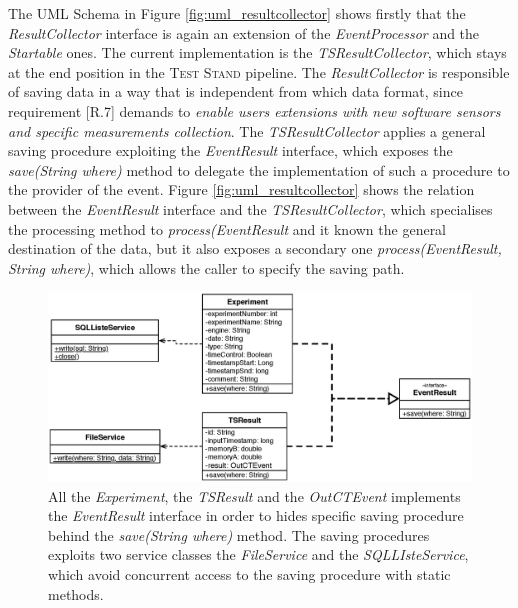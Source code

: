 The UML Schema in Figure \ref{fig:uml_resultcollector} shows firstly that the \textit{ResultCollector} interface is again an extension of the \textit{EventProcessor} and the \textit{Startable} ones. The current implementation is the \textit{TSResultCollector}, which stays at the end position in the \textsc{Test Stand} pipeline. The \textit{ResultCollector} is responsible of saving data in a way that is independent from which data format, since requirement [R.7] demands to \textit{enable users extensions with new software sensors and specific measurements collection}. The \textit{TSResultCollector} applies a general saving procedure exploiting the \textit{EventResult} interface, which exposes the \textit{save(String where)} method to delegate the implementation of such a procedure to the provider of the event. Figure \ref{fig:uml_resultcollector} shows the relation between the \textit{EventResult} interface and the \textit{TSResultCollector}, which specialises the processing method to \textit{process(EventResult} and it known the general destination of the data, but it also exposes a secondary one \textit{process(EventResult, String where)}, which allows the caller to specify the saving path.


\begin{figure}[tbh]
  \centering
	\includegraphics[width=\linewidth]{images/uml_resultcollector_events}
	\caption[UML Schema: \textsc{ResultCollector} Events]{ All the \textit{Experiment}, the \textit{TSResult} and the \textit{OutCTEvent} implements the \textit{EventResult} interface in order to hides specific saving procedure behind the \textit{save(String where)} method. The saving procedures exploits two service classes the \textit{FileService} and the \textit{SQLLIsteService}, which avoid concurrent access to the saving procedure with static methods.} 
  	\label{fig:uml_resultcollector_events}
\end{figure}

